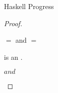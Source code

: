 \begin{theorem}{Haskell Progress}
\begin{proof}
\begin{case}{\pshm}
\begin{subcase}{\first{\vartyh} $=$ \x and \first{\vartym} $=$ \y}
\psvaleqm
{\first{\varexpm}}
{\tyfor{\second{\tyvarm}}{\third{\vartym}}}
{\z}
\psred
{\exphm{(\x)}{(\y)}{(\z)}}
{\exptabs{\first{\tyvarh}}{\exphm{\second{\vartyh}}{\tysubst{\second{\vartym}}{\tylump}{\first{\tyvarm}}}{\expsubst{\second{\varexpm}}{\tylump}{\second{\tyvarm}}}}}

\end{subcase}

\pssub
{\first{\varexpm}}
{\second{\varexpm}}
{\pshm}
{\exphm{\first{\vartyh}}{\first{\vartym}}{\second{\varexpm}}}
\pserr
{\first{\varexpm}}
{\pshm}

\end{case}


\newcommand{\pshs}{\exphs{\first{\varcsh}}{\first{\varexps}}}

\begin{case}{\pshs}

\pshypby
{\first{\varexps}}
{\second{\varexps}}
\pscasesone
{\first{\varexps}}
{\first{\varcsh}}
{\pshs}


\begin{subcase}{\cslump}

\exphs{\cslump}{\first{\varexps}} is an \prouv.

\end{subcase}


\begin{subcase}{\csnum}

\psred
{\exphs{\csnum}{\expnum{\varnum}}}
{{\expnum{\varnum}}}
\psrednote
{\exphs{\csnum}{\first{\varexps}}}
{\expwrongs{\tynum}{\errnum}}
{\first{\varexps} \neq \expnum{\varnum}}

\end{subcase}


\renewcommand{\x}{\cslist{\second{\varcsh}}}

\begin{subcase}{\x}

\psred
{\exphs{\x}{\expnild}}
{\expnils{\tyunbrand{\second{\varcsh}}}}
\psred
{\exphs{\x}{(\expcons{\first{\varvalus}}{\second{\varvalus}})}}
{\expcons{(\exphs{\varcsh}{\first{\varvalus}})}{(\exphs{\x}{\second{\varvalus}})}}
\psrednote
{\exphs{\x}{\first{\varexps}}}
{\expwrongs{\tyunbrand{\x}}{\errlist}}
{\first{\varexps} \neq \expnild$ and $\first{\varexps} \neq \expcons{\first{\varvalus}}{\second{\varvalus}}}

\end{subcase}


\end{case}
\end{proof}
\end{theorem}

